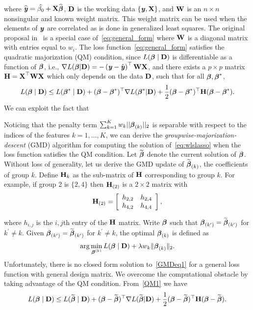 where $\widehat{\textbf{\emph{y}}}=\hat{\beta_0}+\textbf{X}\widehat{\boldsymbol{\beta}}$, $\textbf{D}$ is the working data $\lbrace \textbf{\emph{y}}, \textbf{X} \rbrace$, and $\textbf{W}$ is an $n \times n$ nonsingular and known weight matrix. This weight matrix can be used when the elements of $\textbf{\emph{y}}$ are correlated as is done in generalized least squares. The original proposal in~\cite{yang2015fast} is a special case of~\eqref{eq:general_form} where $\textbf{W}$ is a diagonal matrix with entries equal to $w_i$. The loss function~\eqref{eq:general_form} satisfies the quadratic majorization (QM) condition, since $L(\boldsymbol{\beta}\mid\textbf{D})$ is differentiable as a function of $\boldsymbol{\beta}$, i.e., $\nabla L(\boldsymbol{\beta}|\textbf{D})=-\left(\textbf{\emph{y}}-\hat{\textbf{\emph{y}}}\right)^{\top}\mathbf{W}\textbf{X}$, and there exists
a $p\times p$ matrix $\textbf{H}=\textbf{X}^{\top}\mathbf{W}\textbf{X}$ which only depends on the data $\textbf{D}$, such that for all $\boldsymbol{\beta},\boldsymbol{\beta}^{*}$,
\begin{equation}
L(\boldsymbol{\beta}\mid\textbf{D})\le L(\boldsymbol{\beta}^{*}\mid\textbf{D})+(\boldsymbol{\beta}-\boldsymbol{\beta}^{*})^{\top}\nabla L(\boldsymbol{\beta}^{*}|\textbf{D})+\frac{1}{2}(\boldsymbol{\beta}-\boldsymbol{\beta}^{*})^{\top}\textbf{H}(\boldsymbol{\beta}-\boldsymbol{\beta}^{*}).\label{QM1}
\end{equation}
We can exploit the fact that


Noticing that the penalty term $\sum_{k=1}^{K}w_{k}||\boldsymbol{\beta}_{(k)}||_{2}$ is separable with respect to the indices of the features $k=1, \ldots, K$, we can derive the \textit{groupwise-majorization-descent} (GMD) algorithm for computing the solution of~\eqref{eq:wlslasso} when the loss function satisfies the QM condition. Let $\widetilde{\boldsymbol{\beta}}$ denote the current solution of $\boldsymbol{\beta}$. Without loss of generality, let us derive the GMD update of $\widetilde{\boldsymbol{\beta}}_{(k)}$, the coefficients of group $k$. Define $\textbf{H}_{k}$ as the sub-matrix of $\textbf{H}$ corresponding to group $k$. For example, if group 2 is $\{2,4\}$ then $\textbf{H}_{(2)}$ is a $2\times2$ matrix with
\[
\textbf{H}_{(2)}=\left[\begin{array}{cc}
h_{2,2} & h_{2,4}\\
h_{4,2} & h_{4,4}
\end{array}\right],
\]

where $h_{i,j}$ is the $i,j$th entry of the $\textbf{H}$ matrix. Write $\boldsymbol{\beta}$ such that $\boldsymbol{\beta}_{(k^{\prime})}=\widetilde{\boldsymbol{\beta}}_{(k^{\prime})}$ for $k^{\prime}\ne k$. Given $\boldsymbol{\beta}_{(k^{\prime})}=\widetilde{\boldsymbol{\beta}}_{(k^{\prime})}$ for $k^{\prime}\ne k$, the optimal $\boldsymbol{\beta}_{(k)}$ is defined as
\begin{equation}
\arg\min_{\boldsymbol{\beta}^{(k)}}L(\boldsymbol{\beta}\mid\textbf{D})+\lambda w_{k}\Vert\boldsymbol{\beta}_{(k)}\Vert_{2}.\label{GMDeq1}
\end{equation}
Unfortunately, there is no closed form solution to~\eqref{GMDeq1} for a general loss function with general design matrix. We overcome the computational obstacle by taking advantage of the QM condition. From~\eqref{QM1} we have
\[
L(\boldsymbol{\beta}\mid\textbf{D})\le L(\widetilde{\boldsymbol{\beta}}\mid\textbf{D})+(\boldsymbol{\beta}-\widetilde{\boldsymbol{\beta}})^{\top}\nabla L(\widetilde{\boldsymbol{\beta}}|\textbf{D})+\frac{1}{2}(\boldsymbol{\beta}-\widetilde{\boldsymbol{\beta}})^{\top}\textbf{H}(\boldsymbol{\beta}-\widetilde{\boldsymbol{\beta}}).
\]


